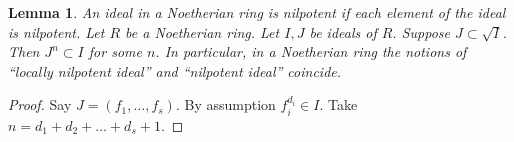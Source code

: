 \documentclass[10pt,a4paper]{amsart}
\newenvironment{slogan}{\comment}{\endcomment}
\theoremstyle{plain}
\newtheorem{lemma}[subsection]{Lemma}
\theoremstyle{definition}
\theoremstyle{remark}
\numberwithin{equation}{subsection}
\begin{document}
\begin{lemma}
\label{lemma-Noetherian-power}
\begin{slogan}
An ideal in a Noetherian ring is nilpotent if each element
of the ideal is nilpotent.
\end{slogan}
Let $R$ be a Noetherian ring. Let $I, J$ be ideals of $R$.
Suppose $J \subset \sqrt{I}$. Then $J^n \subset I$ for some $n$.
In particular, in a Noetherian ring the notions of
``locally nilpotent ideal''
and ``nilpotent ideal'' coincide.
\end{lemma}

\begin{proof}
Say $J = (f_1, \ldots, f_s)$.
By assumption $f_i^{d_i} \in I$.
Take $n = d_1 + d_2 + \ldots + d_s + 1$.
\end{proof}
\end{document}
